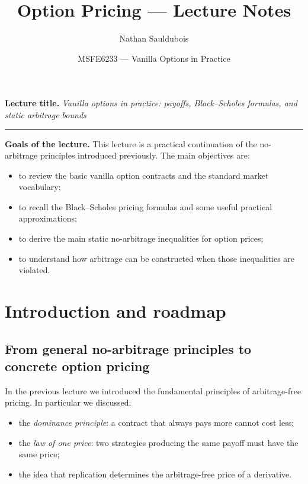 \documentclass[11pt]{article}
\title{Option Pricing --- Lecture Notes}
\author{Nathan Sauldubois}
\date{MSFE6233 --- Vanilla Options in Practice}
\newcommand{\1}{\mathbf{1}}
\theoremstyle{plain}
\theoremstyle{definition}
\theoremstyle{remark}
\begin{document}
\maketitle
\vspace{-1em}

\noindent\textbf{Lecture title.}
\emph{Vanilla options in practice: payoffs, Black--Scholes formulas, and static arbitrage bounds}

\vspace{0.5em}
\hrule
\vspace{1em}

\noindent\textbf{Goals of the lecture.}
This lecture is a practical continuation of the no-arbitrage principles introduced previously.
The main objectives are:
\begin{itemize}[leftmargin=1.4em]
    \item to review the basic vanilla option contracts and the standard market vocabulary;
    \item to recall the Black--Scholes pricing formulas and some useful practical approximations;
    \item to derive the main static no-arbitrage inequalities for option prices;
    \item to understand how arbitrage can be constructed when those inequalities are violated.
\end{itemize}

\tableofcontents
\bigskip

\section{Introduction and roadmap}

\subsection{From general no-arbitrage principles to concrete option pricing}

In the previous lecture we introduced the fundamental principles of
arbitrage-free pricing.  
In particular we discussed:

\begin{itemize}[leftmargin=1.4em]
    \item the \emph{dominance principle}: a contract that always pays more
    cannot cost less;
    \item the \emph{law of one price}: two strategies producing the same payoff
    must have the same price;
    \item the idea that replication determines the arbitrage-free price
    of a derivative.
\end{itemize}
\end{document}
